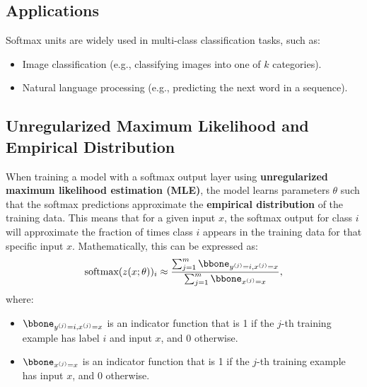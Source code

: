 \begin{notechapter}
\subsection{Applications}
Softmax units are widely used in multi-class classification tasks, such as:
\begin{itemize}
    \item Image classification (e.g., classifying images into one of \( k \) categories).
    \item Natural language processing (e.g., predicting the next word in a sequence).
\end{itemize}

\subsection{Unregularized Maximum Likelihood and Empirical Distribution}
When training a model with a softmax output layer using \textbf{unregularized maximum likelihood estimation (MLE)}, the model learns parameters \( \theta \) such that the softmax predictions approximate the \textbf{empirical distribution} of the training data. This means that for a given input \( x \), the softmax output for class \( i \) will approximate the fraction of times class \( i \) appears in the training data for that specific input \( x \). Mathematically, this can be expressed as:
\[
\text{softmax}(z(x; \theta))_i \approx \frac{\sum_{j=1}^m \bbone_{y^{(j)} = i, x^{(j)} = x}}{\sum_{j=1}^m \bbone_{x^{(j)} = x}},
\]
where:
\begin{itemize}
    \item \( \bbone_{y^{(j)} = i, x^{(j)} = x} \) is an indicator function that is 1 if the \( j \)-th training example has label \( i \) and input \( x \), and 0 otherwise.
    \item \( \bbone_{x^{(j)} = x} \) is an indicator function that is 1 if the \( j \)-th training example has input \( x \), and 0 otherwise.
\end{itemize}


\end{notechapter}
